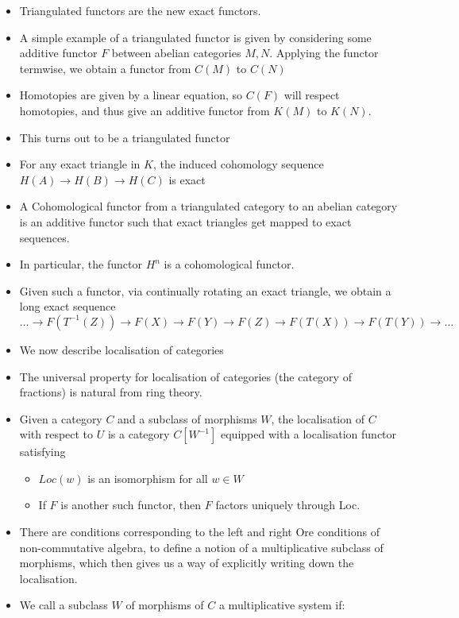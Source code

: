 \documentclass[a4paper]{article}
\begin{document}
\begin{itemize}
    \item Triangulated functors are the new exact functors.
    \item A simple example of a triangulated functor is given by considering some additive functor $F$ between abelian categories $M, N$. Applying the functor termwise, we obtain a functor from $C(M)$ to $C(N)$
    \item Homotopies are given by a linear equation, so $C(F)$ will respect homotopies, and thus give an additive functor from $K(M)$ to $K(N)$.
    \item This turns out to be a triangulated functor
    \item For any exact triangle in $K$, the induced cohomology sequence $H(A) \to H(B) \to H(C)$ is exact
    \item A Cohomological functor from a triangulated category to an abelian category is an additive functor such that exact triangles get mapped to exact sequences.
    \item In particular, the functor $H^n$ is a cohomological functor.
    \item Given such a functor, via continually rotating an exact triangle, we obtain a long exact sequence
        \[
            \dots \to F(T^{-1}(Z)) \to F(X) \to F(Y) \to F(Z) \to F(T(X)) \to F(T(Y)) \to \dots
        \]
    \item We now describe localisation of categories
    \item The universal property for localisation of categories (the category of fractions) is natural from ring theory.
    \item Given a category $C$ and a subclass of morphisms $W$, the localisation of $C$ with respect to $U$ is a category $C[W^{-1}]$ equipped with a localisation functor satisfying
        \begin{itemize}
            \item $Loc(w)$ is an isomorphism for all $w\in W$
            \item If $F$ is another such functor, then $F$ factors uniquely through Loc.
        \end{itemize}
    \item There are conditions corresponding to the left and right Ore conditions of non-commutative algebra, to define a notion of a multiplicative subclass of morphisms, which then gives us a way of explicitly writing down the localisation.
    \item We call a subclass $W$ of morphisms of $C$ a multiplicative system if:
        \begin{itemize}

\end{itemize}
\end{itemize}
\end{document}
